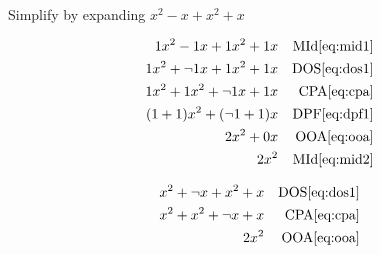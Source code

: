 \documentclass[20150903-160354-rs2.2-MarksMathNotebook.tex]{subfiles}
\begin{document}
\begin{example}[id:20141106-154547] \label{20141106-154547}  \hfill \\

Simplify by expanding $x^2-x+x^2+x$

\soln

\solnsteps
\begin{align*}
1x^2-1x+1x^2+1x && \text{MId} \eqref{eq:mid1} \\
1x^2+\neg 1 x + 1x^2+1x && \text{DOS} \eqref{eq:dos1} \\
1x^2+1x^2+\neg 1x+1x && \text{CPA} \eqref{eq:cpa} \\
(1+1)x^2+(\neg 1 + 1)x && \text{DPF} \eqref{eq:dpf1} \\
2x^2+0x && \text{OOA} \eqref{eq:ooa} \\
2x^2 && \text{MId} \eqref{eq:mid2}
\end{align*}

\soln

\lesssteps
\begin{align*}
x^2 + \neg x + x^2 + x && \text{DOS} \eqref{eq:dos1} \\
x^2 + x^2 + \neg x + x && \text{CPA} \eqref{eq:cpa} \\
2x^2 && \text{OOA} \eqref{eq:ooa}
\end{align*}

\end{example}
\end{document}
